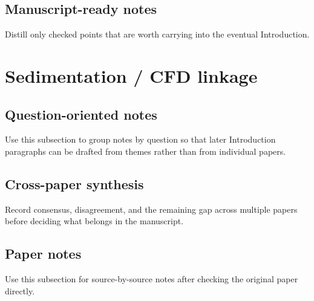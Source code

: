 \documentclass[11pt]{article}
\begin{document}
\subsection{Manuscript-ready notes}
Distill only checked points that are worth carrying into the eventual Introduction.

\section{Sedimentation / CFD linkage}

\subsection{Question-oriented notes}
Use this subsection to group notes by question so that later Introduction paragraphs can be drafted from themes rather than from individual papers.

\subsection{Cross-paper synthesis}
Record consensus, disagreement, and the remaining gap across multiple papers before deciding what belongs in the manuscript.

\subsection{Paper notes}
Use this subsection for source-by-source notes after checking the original paper directly.
%
\end{document}
